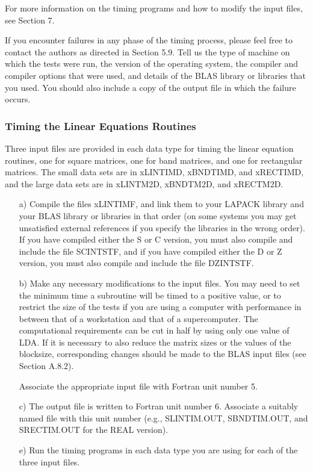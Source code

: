 For more information on the timing programs and how to modify the
input files, see Section 7.

If you encounter failures in any phase of the timing process, please
feel free to contact the authors as directed in Section 5.9.  Tell us the
type of machine on which the tests were run, the version of the operating
system, the compiler and compiler options that were used,
and details of the BLAS library or libraries that you used.  You should
also include a copy of the output file in which the failure occurs.

\subsubsection{Timing the Linear Equations Routines}

\dent
Three input files are provided in each data type for timing the
linear equation routines, one for square matrices, one for band
matrices, and one for rectangular matrices.  The small data sets are
in xLINTIMD, xBNDTIMD, and xRECTIMD, 
and the large data sets are in xLINTM2D, xBNDTM2D, and xRECTM2D.

\begin{itemize}
\item[a)]
Compile the files xLINTIMF, and link them to your LAPACK library and your
BLAS library or libraries in that order (on some systems you may get
unsatisfied external references if you specify the libraries in the wrong
order).
If you have compiled either the S or C version,
you must also compile and include the file SCINTSTF,
and if you have compiled either the D or Z version,
you must also compile and include the file DZINTSTF.

\item[b)]
Make any necessary modifications to the input files.
You may need to set the minimum time a subroutine will 
be timed to a positive value, or to restrict the size of the tests
if you are using a computer with performance in between that of a
workstation and that of a supercomputer.
The computational requirements can be cut in half by using only one
value of LDA.
If it is necessary to also reduce the matrix sizes or the values of
the blocksize, corresponding changes should be made to the 
BLAS input files (see Section A.8.2).

Associate the appropriate input file with Fortran unit number 5.

\item[c)]
The output file is written to Fortran unit number 6. 
Associate a suitably named file with this unit number
(e.g., SLINTIM.OUT, SBNDTIM.OUT, and SRECTIM.OUT for the REAL version).

\item[e)]
Run the timing programs in each data type you are using for
each of the three input files.

\end{itemize}

